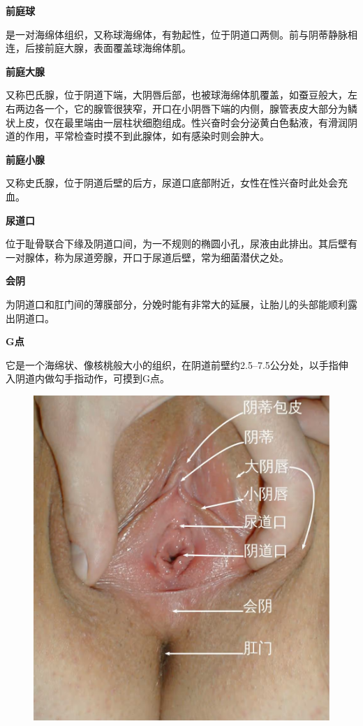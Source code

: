 \documentclass[12pt,UTF8]{ctexbook}
\begin{document}
\textbf{前庭球}

是一对海绵体组织，又称球海绵体，有勃起性，位于阴道口两侧。前与阴蒂静脉相连，后接前庭大腺，表面覆盖球海绵体肌。

\textbf{前庭大腺}

又称巴氏腺，位于阴道下端，大阴唇后部，也被球海绵体肌覆盖，如蚕豆般大，左右两边各一个，它的腺管很狭窄，开口在小阴唇下端的内侧，腺管表皮大部分为鳞状上皮，仅在最里端由一层柱状细胞组成。性兴奋时会分泌黄白色黏液，有滑润阴道的作用，平常检查时摸不到此腺体，如有感染时则会肿大。

\textbf{前庭小腺}

又称史氏腺，位于阴道后壁的后方，尿道口底部附近，女性在性兴奋时此处会充血。

\textbf{尿道口}

位于耻骨联合下缘及阴道口间，为一不规则的椭圆小孔，尿液由此排出。其后壁有一对腺体，称为尿道旁腺，开口于尿道后壁，常为细菌潜伏之处。

\textbf{会阴}

为阴道口和肛门间的薄膜部分，分娩时能有非常大的延展，让胎儿的头部能顺利露出阴道口。

\textbf{G点}

它是一个海绵状、像核桃般大小的组织，在阴道前壁约2.5--7.5公分处，以手指伸入阴道内做勾手指动作，可摸到G点。

\begin{figure}[H]
	\centering
	\includegraphics[width=0.7\linewidth]{1}
	\caption{}
	\label{fig:1}
\end{figure}
\end{document}
